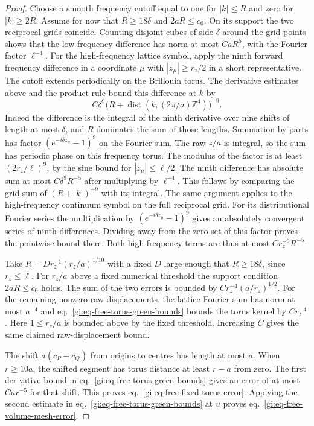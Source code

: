 \documentclass[11pt,letterpaper,reqno]{amsart}
\numberwithin{equation}{section}
\renewcommand{\eqref}[1]{\textup{eq.~\ref{#1}}}
\theoremstyle{definition}
\theoremstyle{remark}
\begin{document}
\begin{proof}
Choose a smooth frequency cutoff equal to one for \(|k|\le R\)
and zero for \(|k|\ge2R\). Assume for now that \(R\ge18\delta\)
and \(2aR\le c_0\). On its support the two reciprocal grids
coincide. Counting disjoint cubes of side \(\delta\) around
the grid points shows that the low-frequency difference has
norm at most \(CaR^5\), with the Fourier factor \(\ell^{-4}\).
For the high-frequency lattice symbol, apply the ninth
forward frequency difference in a coordinate \(\mu\) with
\(|z_\mu|\ge r_z/2\) in a short representative. The cutoff
extends periodically on the Brillouin torus. The derivative
estimates above and the product rule bound this difference at
\(k\) by
\[
   C\delta^9\bigl(R+\operatorname{dist}(k,(2\pi/a)\mathbb Z^4)\bigr)^{-9}.
\]
Indeed the difference is the integral of the ninth derivative
over nine shifts of length at most \(\delta\), and \(R\)
dominates the sum of those lengths. Summation by parts has
factor \((e^{-i\delta z_\mu}-1)^9\) on the Fourier sum.
The raw \(z/a\) is integral, so the sum has periodic phase
on this frequency torus. The modulus of the factor is at
least \((2r_z/\ell)^9\), by the sine bound for
\(|z_\mu|\le\ell/2\). The ninth difference has absolute sum
at most \(C\delta^9R^{-5}\) after multiplying by \(\ell^{-4}\).
This follows by comparing the grid sum of
\((R+|k|)^{-9}\) with its integral. The same argument applies
to the high-frequency continuum symbol on the full reciprocal
grid. For its distributional Fourier series the multiplication
by \((e^{-i\delta z_\mu}-1)^9\) gives an absolutely convergent
series of ninth differences. Dividing away from the zero set
of this factor proves the pointwise bound there.
Both high-frequency terms are thus at most \(C r_z^{-9}R^{-5}\).

Take \(R=D r_z^{-1}(r_z/a)^{1/10}\) with a fixed \(D\)
large enough that \(R\ge18\delta\), since \(r_z\le\ell\).
For \(r_z/a\) above a fixed numerical threshold the support
condition \(2aR\le c_0\) holds. The sum of the two errors is
bounded by \(C r_z^{-4}(a/r_z)^{1/2}\).
For the remaining nonzero raw displacements, the lattice
Fourier sum has norm at most \(a^{-4}\) and
\eqref{gi:eq-free-torus-green-bounds} bounds the torus
kernel by \(Cr_z^{-4}\). Here \(1\le r_z/a\) is bounded
above by the fixed threshold. Increasing \(C\) gives the
same claimed raw-displacement bound.

The shift \(a(c_P-c_Q)\) from origins to centres has length
at most \(a\). When \(r\ge10a\), the shifted segment has
torus distance at least \(r-a\) from zero. The first derivative
bound in \eqref{gi:eq-free-torus-green-bounds} gives an error
of at most \(Ca r^{-5}\) for that shift.
This proves \eqref{gi:eq-free-fixed-torus-error}. Applying the
second estimate in \eqref{gi:eq-free-torus-green-bounds}
at \(u\) proves \eqref{gi:eq-free-volume-mesh-error}.
\end{proof}
\end{document}
